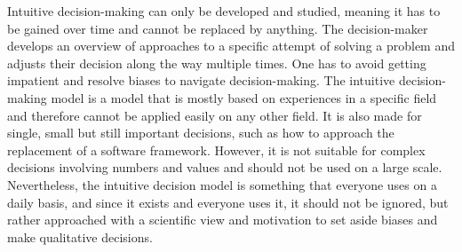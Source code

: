 \newline \noindent Intuitive decision-making can only be developed and studied, meaning it has to be gained over time and cannot be replaced by anything. The decision-maker develops an overview of approaches to a specific attempt of solving a problem and adjusts their decision along the way multiple times. One has to avoid getting impatient and resolve biases to navigate decision-making. 
\newline \noindent The intuitive decision-making model is a model that is mostly based on experiences in a specific field and therefore cannot be applied easily on any other field. It is also made for single, small but still important decisions, such as how to approach the replacement of a software framework. However, it is not suitable for complex decisions involving numbers and values and should not be used on a large scale. Nevertheless, the intuitive decision model is something that everyone uses on a daily basis, and since it exists and everyone uses it, it should not be ignored, but rather approached with a scientific view and motivation to set aside biases and make qualitative decisions. \cite{sauter_1999}

\newpage

